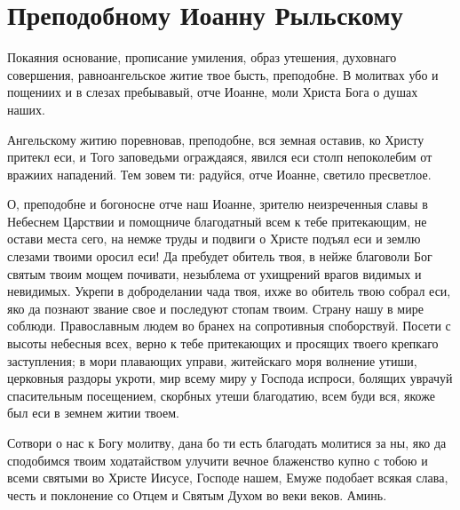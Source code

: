 \section{Преподобному Иоанну Рыльскому}\begin{mymulticols}


Покаяния основание, прописание умиления, образ утешения, духовнаго совершения, равноангельское житие твое бысть, преподобне. В молитвах убо и пощениих и в слезах пребывавый, отче Иоанне, моли Христа Бога о душах наших.


Ангельскому житию поревновав, преподобне, вся земная оставив, ко Христу притекл еси, и Того заповедьми ограждаяся, явился еси столп непоколебим от вражиих нападений. Тем зовем ти: радуйся, отче Иоанне, светило пресветлое.


О, преподобне и богоносне отче наш Иоанне, зрителю неизреченныя славы в Небеснем Царствии и помощниче благодатный всем к тебе притекающим, не остави места сего, на немже труды и подвиги о Христе подъял еси и землю слезами твоими оросил еси! Да пребудет обитель твоя, в нейже благоволи Бог святым твоим мощем почивати, незыблема от ухищрений врагов видимых и невидимых. Укрепи в доброделании чада твоя, ихже во обитель твою собрал еси, яко да познают звание свое и последуют стопам твоим. Страну нашу в мире соблюди. Православным людем во бранех на сопротивныя споборствуй. Посети с высоты небесныя всех, верно к тебе притекающих и просящих твоего крепкаго заступления; в мори плавающих управи, житейскаго моря волнение утиши, церковныя раздоры укроти, мир всему миру у Господа испроси, болящих уврачуй спасительным посещением, скорбных утеши благодатию, всем буди вся, якоже был еси в земнем житии твоем.

Сотвори о нас к Богу молитву, дана бо ти есть благодать молитися за ны, яко да сподобимся твоим ходатайством улучити вечное блаженство купно с тобою и всеми святыми во Христе Иисусе, Господе нашем, Емуже подобает всякая слава, честь и поклонение со Отцем и Святым Духом во веки веков. Аминь.

\end{mymulticols}

\mychapterending


